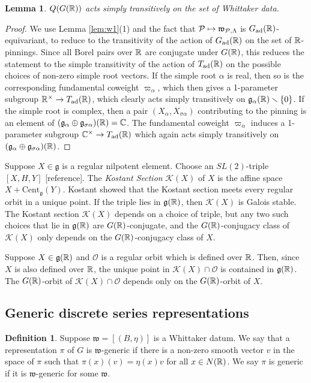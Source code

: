\documentclass{article}
\newtheorem{lem}[thm]{Lemma}
\theoremstyle{definition}
\newtheorem{dfn}[thm]{Definition}
\numberwithin{equation}{section}
\renewcommand{\-}{\hyp{}}
\newcommand{\g}{\mathfrak g}
\renewcommand{\O}{\mathcal O}
\newcommand{\K}{\mathcal K}
\newcommand{\w}{\mathfrak w}
\newcommand{\Cent}{\mathrm{Cent}}
\begin{document}
\begin{lem}
	$Q(G(\mathbb{R}))$ acts simply transitively on the set of Whittaker data.
  \end{lem}
  \begin{proof}
	  We use Lemma \ref{lem:w1}(1) and the fact that $\mc{P} \mapsto \w_{\mc{P},\Lambda}$ is $G_{\textrm{ad}}(\mathbb{R})$-equivariant, to reduce to the transitivity of the action of $G_{\textrm{ad}}(\mathbb{R})$ on the set of $\mathbb{R}$-pinnings. Since all Borel pairs over $\mathbb{R}$ are conjugate under $G(\mathbb{R})$, this reduces the statement to the simple transitivity of the action of $T_{\textrm{ad}}(\mathbb{R})$ on the possible choices of non-zero simple root vectors. If the simple root $\alpha$ is real, then so is the corresponding fundamental coweight $\varpi_\alpha$, which then gives a 1-parameter subgroup $\mathbb{R}^\times \to T_{\textrm{ad}}(\mathbb{R})$, which clearly acts simply transitively on $\mathfrak{g}_\alpha(\mathbb{R}) \smallsetminus \{0\}$. If the simple root is complex, then a pair $(X_\alpha,X_{\sigma\alpha})$ contributing to the pinning is an element of $(\mathfrak{g}_\alpha \oplus \mathfrak{g}_{\sigma\alpha})(\mathbb{R}) = \mathbb{C}$. The fundamental coweight $\varpi_\alpha$ induces a 1-parameter subgroup $\mathbb{C}^\times \to T_{\textrm{ad}}(\mathbb{R})$ which again acts simply transitively on $(\mathfrak{g}_\alpha \oplus \mathfrak{g}_{\sigma\alpha})(\mathbb{R})$.
  \end{proof}
  

Suppose $X\in\g$ is a regular nilpotent element. Choose an
$SL(2)$-triple $[X,H,Y]$ [reference].  The {\it Kostant Section} $\K(X)$ of
$X$ is the affine space $X+\Cent_\g(Y)$.
Kostant showed \cite{Kos63} that the Kostant section meets every regular orbit in a unique point. If the triple lies in $\g(\R)$, then $\K(X)$ is Galois stable. The Kostant section $\K(X)$ depends on a choice of
triple, but any two such choices that lie in $\g(\R)$ are $G(\mathbb{R})$-conjugate, and the $G(\mathbb{R})$-conjugacy class of $\K(X)$ only depends on the $G(\mathbb{R})$-conjugacy class of $X$.

Suppose $X\in \g(\R)$ and $\O$ is a regular orbit which is defined over $\mathbb{R}$.
Then, since $X$ is also defined over $\mathbb{R}$, the unique point in $\K(X)\cap \O$ is contained in $\g(\R)$. The $G(\mathbb{R})$-orbit of $\K(X)\cap \O$ depends only on the $G(\mathbb{R})$-orbit of $X$.

\subsection{Generic discrete series representations} \label{sub:gen}

\begin{dfn}
Suppose $\w=[(B,\eta)]$ is a Whittaker datum. We say that a representation $\pi$ of $G$ is $\w$-generic if there is a non-zero smooth vector $v$ in the space of $\pi$ such that $\pi(x)(v)=\eta(x)v$ for all $x\in N(\mathbb{R})$. We say $\pi$ is generic if it is $\w$-generic for some $\w$. 
\end{dfn}
\end{document}
